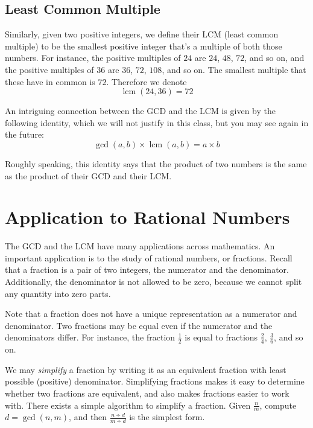 \documentclass[a4paper,10pt]{report}
\begin{document}
\subsection{Least Common Multiple}

Similarly, given two positive integers, we define their LCM (least common
multiple) to be the smallest positive integer that's a multiple of both those
numbers. For instance, the positive multiples of \(24\) are \(24\), \(48\),
\(72\), and so on, and the positive multiples of \(36\) are \(36\), \(72\),
\(108\), and so on. The smallest multiple that these have in common is \(72\).
Therefore we denote \[
 \operatorname{lcm}(24, 36) = 72
\]

An intriguing connection between the GCD and the LCM is given by the following
identity, which we will not justify in this class, but you may see again in the
future: \begin{equation}
 \gcd(a, b) \times \operatorname{lcm}(a, b) = a \times b
\end{equation}

Roughly speaking, this identity says that the product of two numbers is the
same as the product of their GCD and their LCM.

\section{Application to Rational Numbers}

The GCD and the LCM have many applications across mathematics. An important
application is to the study of rational numbers, or fractions. Recall that a
fraction is a pair of two integers, the numerator and the denominator.
Additionally, the denominator is not allowed to be zero, because we cannot
split any quantity into zero parts.

Note that a fraction does not have a unique representation as a numerator and
denominator. Two fractions may be equal even if the numerator and the
denominators differ. For instance, the fraction \(\frac{1}{2}\) is equal to
fractions \(\frac{2}{4}\), \(\frac{3}{6}\), and so on.

We may \emph{simplify} a fraction by writing it as an equivalent fraction with
least possible (positive) denominator. Simplifying fractions makes it easy to
determine whether two fractions are equivalent, and also makes fractions easier
to work with. There exists a simple algorithm to simplify a fraction. Given
\(\frac{n}{m}\), compute \(d=\gcd(n, m)\), and then \(\frac{n\div d}{m\div d}\)
is the simplest form.
\end{document}
